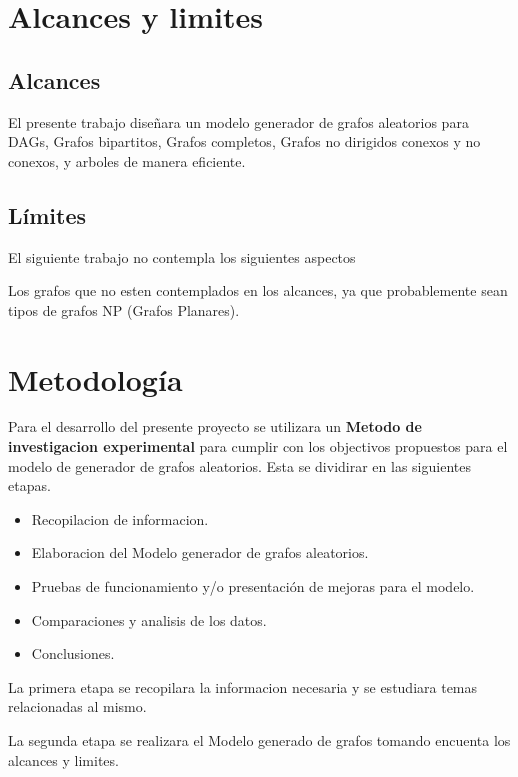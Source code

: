 \documentclass[11pt]{extarticle}
\begin{document}
\section{Alcances y limites}
  \subsection{Alcances}
    \begin{itemize}
      \guion El presente trabajo diseñara un modelo generador de grafos aleatorios
            para DAGs, Grafos bipartitos, Grafos completos, Grafos no dirigidos
            conexos y no conexos, y arboles de manera eficiente.
      \end{itemize}
  \subsection{L\'imites}
    El siguiente trabajo no contempla los siguientes aspectos
    \begin{itemize}
      \guion Los grafos que no esten contemplados en los alcances,
             ya que probablemente sean tipos de grafos NP (Grafos Planares).
    \end{itemize}
\section{Metodolog\'ia}
  Para el desarrollo del presente proyecto se utilizara un 
  \textbf{Metodo de investigacion experimental} para cumplir con los 
    objectivos propuestos para el modelo de generador de grafos aleatorios. 
    Esta se dividirar en las siguientes etapas.
    \begin{itemize}
      \item Recopilacion de informacion.
      \item Elaboracion del Modelo generador de grafos aleatorios.
      \item Pruebas de funcionamiento y/o presentación de mejoras para el modelo.
      \item Comparaciones y analisis de los datos.
      \item Conclusiones.
    \end{itemize}
    
    La primera etapa se recopilara la informacion necesaria y
    se estudiara temas relacionadas al mismo.\hfill\break

    La segunda etapa se realizara el Modelo generado de grafos tomando
    encuenta los alcances y limites. \hfill\break
\end{document}
